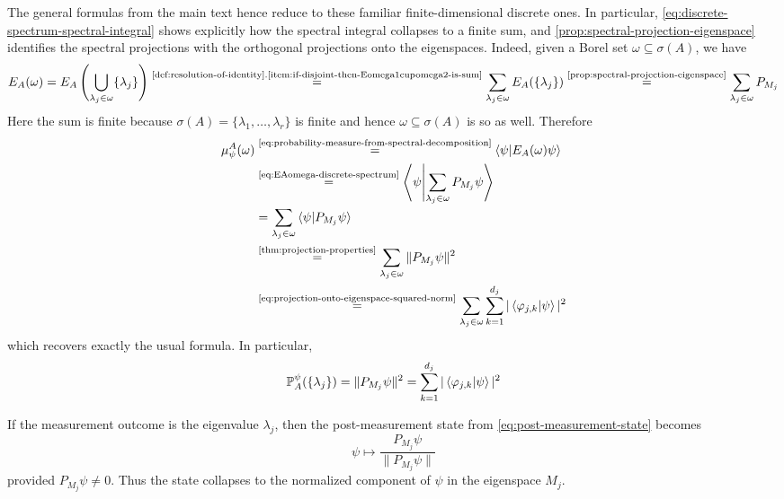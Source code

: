 \begin{example}
The general formulas from the main text hence reduce to these familiar finite-dimensional discrete ones. In particular, \eqref{eq:discrete-spectrum-spectral-integral} shows explicitly how the spectral integral collapses to a finite sum, and \autoref{prop:spectral-projection-eigenspace} identifies the spectral projections with the orthogonal projections onto the eigenspaces.
Indeed, given a Borel set $\omega \subseteq \sigma(A)$, we have
\begin{equation}\label{eq:EAomega-discrete-spectrum}
E_A(\omega) 
=
E_A\left(\bigcup_{\smash[b]{\lambda_j} \in \omega} \{\lambda_j\}\right)
\overset{\text{\ref{def:resolution-of-identity}.\ref{item:if-disjoint-then-Eomega1cupomega2-is-sum}}}{=} 
\sum_{\lambda_j \in \omega} E_A(\{\lambda_j\})
\overset{\text{\ref{prop:spectral-projection-eigenspace}}}{=}
\sum_{\lambda_j \in \omega} P_{M_j}
\end{equation}
Here the sum is finite because $\sigma({A})=\{\lambda_1,\dots,\lambda_r\}$ is finite and hence $\omega \subseteq \sigma(A)$ is so as well.
Therefore
\[
\begin{aligned}
\mu_\psi^{A}(\omega)
&\overset{\text{\eqref{eq:probability-measure-from-spectral-decomposition}}}{=}
\braket{\psi|E_{A}(\omega)\psi}
\\
&\overset{\text{\eqref{eq:EAomega-discrete-spectrum}}}{=}
\left\langle \psi \middle| \sum_{\smash[b]{\lambda_j} \in \omega} P_{M_j}\psi \right\rangle
\\
&=
\sum_{\lambda_j \in \omega} \braket{\psi|P_{M_j}\psi}
\\
&\overset{\text{\ref{thm:projection-properties}}}{=}
\sum_{\lambda_j \in \omega} \|P_{M_j}\psi\|^2 %
\\
&\overset{\text{\eqref{eq:projection-onto-eigenspace-squared-norm}}}{=}
\sum_{\lambda_j \in \omega}\sum_{k=1}^{d_j} |\braket{\varphi_{j,k}|\psi}|^2
\end{aligned}
\]
which recovers exactly the usual formula.
In particular,
\begin{equation}\label{eq:projection-onto-eigenspace-born-rule}
\operatorname{\mathbb{P}}_{A}^\psi(\{\lambda_j\})
=
\|P_{M_j}\psi\|^2
=
\sum_{k=1}^{d_j} |\braket{\varphi_{j,k}|\psi}|^2
\end{equation}

If the measurement outcome is the eigenvalue $\lambda_j$, then the post-measurement state from \eqref{eq:post-measurement-state} becomes
\[
\psi
\longmapsto
\frac{P_{M_j}\psi}{\|P_{M_j}\psi\|}
\]
provided $P_{M_j}\psi \neq 0$.
Thus the state collapses to the normalized component of $\psi$ in the eigenspace $M_j$.
\end{example}













